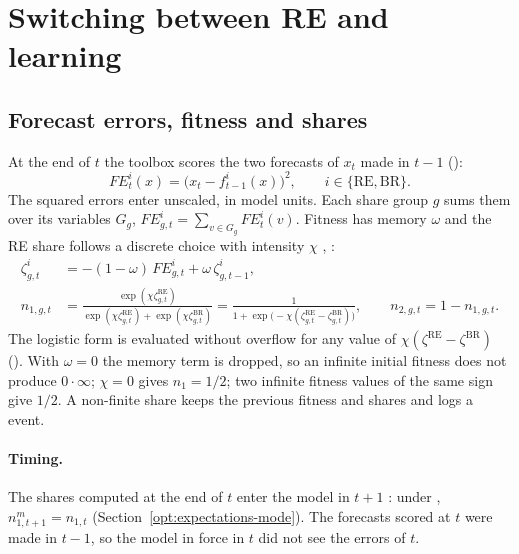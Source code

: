 \documentclass[11pt,a4paper]{article}
\newcommand{\RE}{\mathrm{RE}}
\newcommand{\BR}{\mathrm{BR}}
\newcommand{\FE}{\mathit{FE}}
\begin{document}
\section{Switching between RE and learning}\label{sec:switching}

\subsection{Forecast errors, fitness and shares}\label{sec:dc}

At the end of $t$ the toolbox scores the two forecasts of $x_t$ made in $t-1$
():
\begin{equation}\label{eq:fe}
  \FE^{i}_t(x) = \bigl(x_t - f^{i}_{t-1}(x)\bigr)^2, \qquad i\in\{\RE,\BR\}.
\end{equation}
The squared errors enter unscaled, in model units. Each share group $g$ sums them over its
variables $G_g$, $\FE^i_{g,t} = \sum_{v\in G_g}\FE^i_t(v)$. Fitness has memory $\omega$ and the RE
share follows a discrete choice with intensity $\chi$ \citep[eqs.~14--15]{ozden2025},
\citep{brock1997}:
\begin{align}
  \zeta^{i}_{g,t} &= -(1-\omega)\,\FE^{i}_{g,t} + \omega\,\zeta^{i}_{g,t-1}, \label{eq:fitness}\\
  n_{1,g,t} &= \frac{\exp(\chi\zeta^{\RE}_{g,t})}{\exp(\chi\zeta^{\RE}_{g,t}) + \exp(\chi\zeta^{\BR}_{g,t})}
  = \frac{1}{1 + \exp\bigl(-\chi(\zeta^{\RE}_{g,t} - \zeta^{\BR}_{g,t})\bigr)}, \qquad n_{2,g,t} = 1 - n_{1,g,t}. \label{eq:logit}
\end{align}
The logistic form is evaluated without overflow for any value of $\chi(\zeta^{\RE}-\zeta^{\BR})$
(). With $\omega = 0$ the memory term is dropped, so an infinite
initial fitness does not produce $0\cdot\infty$; $\chi = 0$ gives $n_1 = 1/2$; two infinite
fitness values of the same sign give $1/2$. A non-finite share keeps the previous fitness and
shares and logs a  event.

\paragraph{Timing.} The shares computed at the end of $t$ enter the model in $t+1$
\citep[eq.~16]{ozden2025}: under , $n^m_{1,t+1} = n_{1,t}$
(Section~\ref{opt:expectations-mode}). The forecasts scored at $t$ were made in $t-1$, so the
model in force in $t$ did not see the errors of $t$.
\end{document}
